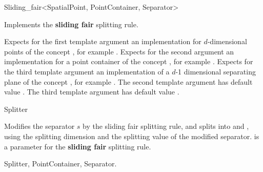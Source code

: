 

\begin{ccRefFunctionObjectClass}{Sliding_fair<SpatialPoint, PointContainer, Separator>}  %


\ccDefinition
Implements the {\bf sliding fair} splitting rule.


\ccParameters

Expects for the first template argument an implementation for
$d$-dimensional points of
the concept , 
for example . Expects for the second argument an implementation
for a point container of the concept , for example .
Expects for the third template argument an implementation of a $d$-1 dimensional 
separating plane of the concept , for example .
The second template argument has default value .
The third template argument has default value . 


\ccIsModel

Splitter

\ccTypes



\ccOperations

{Modifies the separator $s$ by the sliding fair splitting rule, 
and splits  into  and ,
using the splitting dimension and the splitting value of the modified separator.
 is a parameter for the {\bf sliding fair} splitting rule.
}

\ccSeeAlso

Splitter, PointContainer, Separator.

\end{ccRefFunctionObjectClass}




